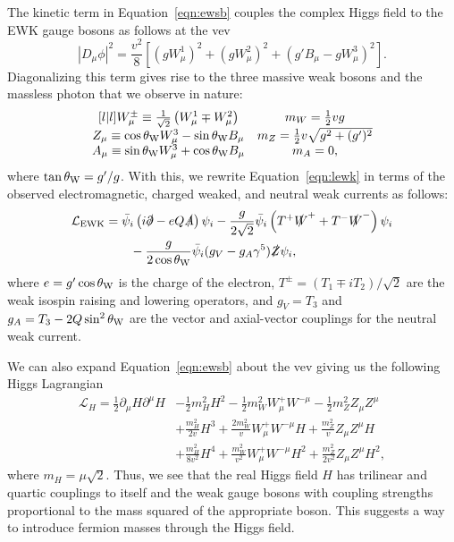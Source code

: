 The kinetic term in Equation~\ref{eqn:ewsb} couples the complex Higgs field to the EWK gauge bosons as follows at the vev
\begin{equation}
  \left| D_\mu \phi \right|^2 = \frac{v^2}{8} \left[ \left(g W_\mu^1 \right)^2 + \left(g W_\mu^2 \right)^2 + \left(g' B_\mu - g W_\mu^3 \right)^2 \right].
\end{equation}
\newpage 
Diagonalizing this term gives rise to the three massive weak bosons and the massless photon that we observe in nature:
\begin{equation}
  \begin{matrix}[l | l]
    W_\mu^{\pm} \equiv \frac{1}{\sqrt{2}} \left( W_\mu^1 \mp W_\mu^2 \right)
    & m_W = \frac{1}{2} vg \\
    Z_\mu \equiv \cos \theta_{\text{W}} W_\mu^3 - \sin \theta_{\text{W}} B_\mu
    & m_Z = \frac{1}{2} v \sqrt{g^2 + (g')^2} \\
    A_\mu \equiv \sin \theta_{\text{W}} W_\mu^3 + \cos \theta_{\text{W}} B_\mu
    & m_A = 0,
  \end{matrix}
\end{equation}
where $\tan \theta_{\text{W}} = g'/g$.
With this, we rewrite Equation~\ref{eqn:lewk} in terms of the observed electromagnetic, charged weaked, and neutral weak currents as follows:
\begin{align}
  \label{eqn:lewsb}
  \mathcal{L}_{\text{EWK}} %
   & = \bar \psi_i \left( i \slashed \partial - e Q \slashed A \right) \psi_i
  - \frac{g}{2\sqrt{2}} \bar \psi_i \left( T^+ \slashed W^+ + T^- \slashed W^- \right) \psi_i \\
  & \qquad - \frac{g}{2 \cos \thetaw} \bar \psi_i (g_V - g_A \gamma^5) \slashed Z \psi_i, 
\end{align}
where $e = g' \cos \theta_{\text{W}}$ is the charge of the electron, $T^\pm = (T_1 \mp i T_2)/\sqrt{2}$ are the weak isospin raising and lowering operators, and $g_V = T_3$ and $g_A = T_3 - 2 Q \sin^2 \theta_{\text{W}}$ are the vector and axial-vector couplings for the neutral weak current.


We can also expand Equation~\ref{eqn:ewsb} about the vev giving us the following Higgs Lagrangian
\begin{align}
  \mathcal{L}_H = \frac{1}{2} \partial_\mu H \partial^\mu H & - \frac{1}{2} m_H^2 H^2 - \frac{1}{2} m_W^2 W_\mu^+ W^{-\mu} - \frac{1}{2} m_Z^2 Z_\mu Z^\mu \\
  & + \frac{m_H^2}{2 v} H^3 + \frac{2 m_W^2}{v} W_\mu^+ W^{-\mu} H + \frac{m_Z^2}{v} Z_\mu Z^\mu H \\
  & + \frac{m_H^2}{8 v^2} H^4 + \frac{m_W^2}{v^2} W_\mu^+ W^{-\mu} H^2 + \frac{m_Z^2}{2v^2} Z_\mu Z^\mu H^2, 
\end{align}
where $m_H = \mu \sqrt{2} $.
Thus, we see that the real Higgs field $H$ has trilinear and quartic couplings to itself and the weak gauge bosons with coupling strengths proportional to the mass squared of the appropriate boson.
This suggests a way to introduce fermion masses through the Higgs field.

